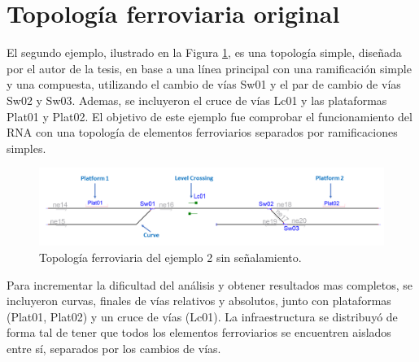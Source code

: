 \section{Topología ferroviaria original}

	El segundo ejemplo, ilustrado en la Figura \ref{fig:EJ2_1}, es una topología simple, diseñada por el autor de la tesis, en base a una línea principal con una ramificación simple y una compuesta, utilizando el cambio de vías Sw01 y el par de cambio de vías Sw02 y Sw03. Ademas, se incluyeron el cruce de vías Lc01 y las plataformas Plat01 y Plat02. El objetivo de este ejemplo fue comprobar el funcionamiento del RNA con una topología de elementos ferroviarios separados por ramificaciones simples.
	
	\begin{figure}[H]
		\centering
		\includegraphics[width=1\textwidth]{resultados-obtenidos/ejemplo2/images/2_empty.png}
		\centering\caption{Topología ferroviaria del ejemplo 2 sin señalamiento.}
		\label{fig:EJ2_1}
	\end{figure}
	
	Para incrementar la dificultad del análisis y obtener resultados mas completos, se incluyeron curvas, finales de vías relativos y absolutos, junto con plataformas (Plat01, Plat02) y un cruce de vías (Lc01). La infraestructura se distribuyó de forma tal de tener que todos los elementos ferroviarios se encuentren aislados entre sí, separados por los cambios de vías.